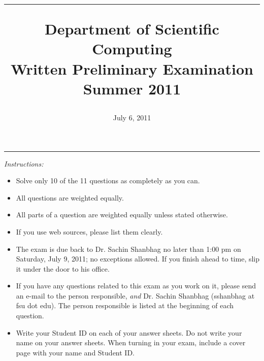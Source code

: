 \documentclass [11point]{article}
\begin{document}
\makeatletter	   %
\renewcommand{\ps@plain}{%
     \renewcommand{\@oddhead}{\textrm{\small {\it DSC Prelim Exam -- Summer 2011}}\hfil\textrm{\thepage}}%
     \renewcommand{\@evenhead}{\@oddhead}%
     \renewcommand{\@oddfoot}{}%
     \renewcommand{\@evenfoot}{\@oddfoot}}
\makeatother     %

\title{
\hrule 
\bigskip
Department of Scientific Computing\\
\textbf{Written Preliminary Examination} \\
Summer 2011 \\
}         %
\author{}        %
\date{July 6, 2011}          %
\maketitle

\pagestyle{plain}

\hrule 
\bigskip
\textit{Instructions:}

\bigskip

\begin{itemize}
\item Solve only 10 of the 11 questions as completely as you can. 

\item All questions are weighted equally.

\item All parts of a question are weighted equally unless stated otherwise.

\item If you use web sources, please list them clearly.

\item The exam is due back to Dr. Sachin Shanbhag no later than 1:00 pm on Saturday, July 9, 2011; no exceptions allowed. If you finish ahead to time, slip it under the door to his office.

\item If you have any questions related to this exam as you work on it, please send an e-mail to the person responsible, \textit{and} Dr. Sachin Shanbhag (sshanbhag at fsu dot edu). The person responsible is listed at the beginning of each question.

\item Write your Student ID on each of your answer sheets. Do not write your name on your answer sheets. When turning in your exam, include a cover page with your name and Student ID.

\end{itemize}
\end{document}
